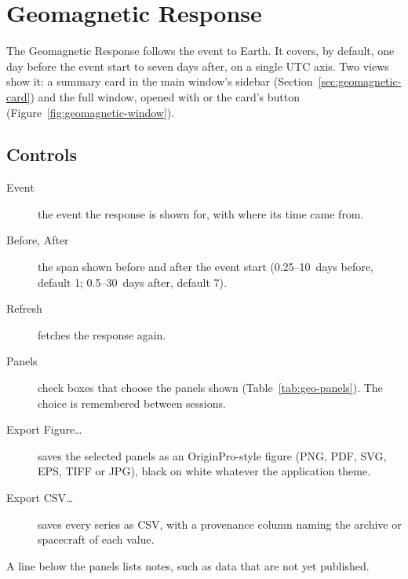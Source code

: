 \section{Geomagnetic Response}
\label{sec:geomagnetic-response}

The Geomagnetic Response follows the event to Earth. It covers, by default, one day before the
event start to seven days after, on a single UTC axis. Two views show it: a summary card in the
main window's sidebar (Section~\ref{sec:geomagnetic-card}) and the full window, opened with
 or the card's 
button (Figure~\ref{fig:geomagnetic-window}).


\subsection{Controls}

\begin{description}
  \item[Event] the event the response is shown for, with where its time came from.
  \item[Before, After] the span shown before and after the event start (0.25--10~days before,
    default 1; 0.5--30~days after, default 7).
  \item[Refresh] fetches the response again.
  \item[Panels] check boxes that choose the panels shown (Table~\ref{tab:geo-panels}). The
    choice is remembered between sessions.
  \item[Export Figure…] saves the selected panels as an OriginPro-style figure (PNG, PDF, SVG,
    EPS, TIFF or JPG), black on white whatever the application theme.
  \item[Export CSV…] saves every series as CSV, with a provenance column naming the archive or
    spacecraft of each value.
\end{description}
A line below the panels lists notes, such as data that are not yet published.

